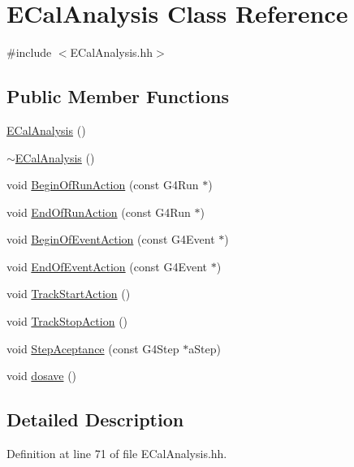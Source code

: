 \hypertarget{class_e_cal_analysis}{\section{E\-Cal\-Analysis Class Reference}
\label{class_e_cal_analysis}
}


{\ttfamily \#include $<$E\-Cal\-Analysis.\-hh$>$}

\subsection*{Public Member Functions}
\begin{DoxyCompactItemize}
\item 
\hyperlink{class_e_cal_analysis_ac36fe71ad15447afcd56596132402037}{E\-Cal\-Analysis} ()
\item 
\hyperlink{class_e_cal_analysis_a9f14afb8f9e07b0f618507c4cdd5c561}{$\sim$\-E\-Cal\-Analysis} ()
\item 
void \hyperlink{class_e_cal_analysis_ac4e972975d457daed4d984a5fce70b90}{Begin\-Of\-Run\-Action} (const G4\-Run $\ast$)
\item 
void \hyperlink{class_e_cal_analysis_abb9d6687444b46ae43647137eb72e0e2}{End\-Of\-Run\-Action} (const G4\-Run $\ast$)
\item 
void \hyperlink{class_e_cal_analysis_adbc751b8a7b0d09714f3d98039e057ba}{Begin\-Of\-Event\-Action} (const G4\-Event $\ast$)
\item 
void \hyperlink{class_e_cal_analysis_a2b22c032753423855ca8af965f2c5f0d}{End\-Of\-Event\-Action} (const G4\-Event $\ast$)
\item 
void \hyperlink{class_e_cal_analysis_a767674ded7fc8a46699d12f6eb7be80f}{Track\-Start\-Action} ()
\item 
void \hyperlink{class_e_cal_analysis_ab51cb6fd622be54138d98c8e72d0add4}{Track\-Stop\-Action} ()
\item 
void \hyperlink{class_e_cal_analysis_a8e9d71768cb60d23faecd6b75b88c060}{Step\-Aceptance} (const G4\-Step $\ast$a\-Step)
\item 
void \hyperlink{class_e_cal_analysis_aa9f1dd2a2863ed234a030f75b2171989}{dosave} ()
\end{DoxyCompactItemize}


\subsection{Detailed Description}


Definition at line 71 of file E\-Cal\-Analysis.\-hh.



